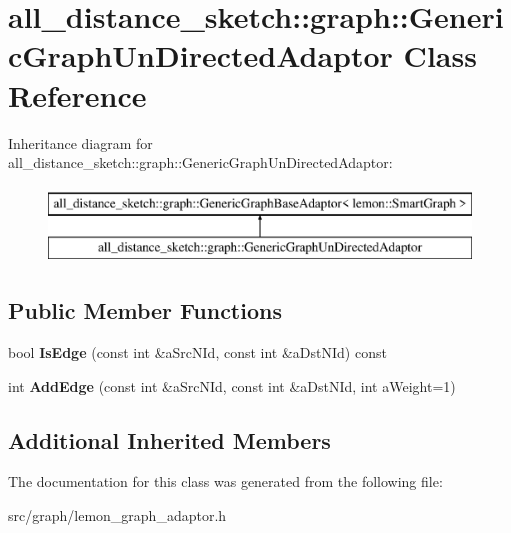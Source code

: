 \hypertarget{classall__distance__sketch_1_1graph_1_1GenericGraphUnDirectedAdaptor}{}\section{all\+\_\+distance\+\_\+sketch\+:\+:graph\+:\+:Generic\+Graph\+Un\+Directed\+Adaptor Class Reference}
\label{classall__distance__sketch_1_1graph_1_1GenericGraphUnDirectedAdaptor}
Inheritance diagram for all\+\_\+distance\+\_\+sketch\+:\+:graph\+:\+:Generic\+Graph\+Un\+Directed\+Adaptor\+:\begin{figure}[H]
\begin{center}
\leavevmode
\includegraphics[height=2.000000cm]{classall__distance__sketch_1_1graph_1_1GenericGraphUnDirectedAdaptor}
\end{center}
\end{figure}
\subsection*{Public Member Functions}
\begin{DoxyCompactItemize}
\item 
\hypertarget{classall__distance__sketch_1_1graph_1_1GenericGraphUnDirectedAdaptor_ad815cd544a2ea28e197a5633c65e2562}{}bool {\bfseries Is\+Edge} (const int \&a\+Src\+N\+Id, const int \&a\+Dst\+N\+Id) const \label{classall__distance__sketch_1_1graph_1_1GenericGraphUnDirectedAdaptor_ad815cd544a2ea28e197a5633c65e2562}

\item 
\hypertarget{classall__distance__sketch_1_1graph_1_1GenericGraphUnDirectedAdaptor_ac607ecebfa8122d28da0d01c07d6e455}{}int {\bfseries Add\+Edge} (const int \&a\+Src\+N\+Id, const int \&a\+Dst\+N\+Id, int a\+Weight=1)\label{classall__distance__sketch_1_1graph_1_1GenericGraphUnDirectedAdaptor_ac607ecebfa8122d28da0d01c07d6e455}

\end{DoxyCompactItemize}
\subsection*{Additional Inherited Members}


The documentation for this class was generated from the following file\+:\begin{DoxyCompactItemize}
\item 
src/graph/lemon\+\_\+graph\+\_\+adaptor.\+h\end{DoxyCompactItemize}
